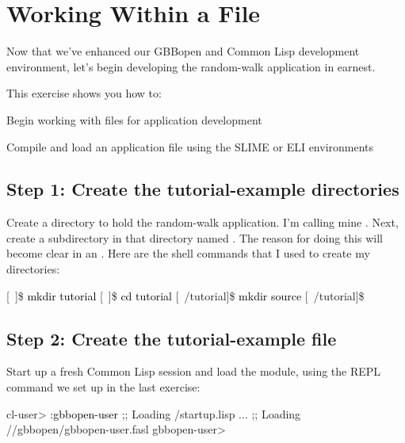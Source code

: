 \documentclass[10pt,twoside,english,pdftex]{article}
\begin{document}

\T\markright{}%
\T\pagestyle{plain}
\T\cleardoublepage
\W{}
\T\pagestyle{fancy}
\T\thispagestyle{fancybottom}
\T\renewcommand{\headrulewidth}{0pt}
\section{Working Within a File}
\label{sec:file}%

Now that we've enhanced our GBBopen and Common Lisp development environment,
let's begin developing the random-walk application in earnest.

\fndocrule

This exercise shows you how to:
\begin{tightitemize}
\item Begin working with files for application development
\item Compile and load an application file using the SLIME or ELI
  environments
\end{tightitemize}

\fndocrule

\subsection*{Step 1: Create the tutorial-example directories}

Create a directory to hold the random-walk application.  I'm calling mine
.  Next, create a subdirectory in that directory named
.  The reason for doing this will become clear in an
. Here are the shell commands
that I used to create my directories:
%
\W\supp
\begin{example}
\textcolor{darkergray}{%
  [~]\$ \textcolor{black}{mkdir tutorial}
  [~]\$ \textcolor{black}{cd tutorial}
  [~/tutorial]\$ \textcolor{black}{mkdir source}
  [~/tutorial]\$}
\end{example}

\subsection*{Step 2: Create the tutorial-example file}

Start up a fresh Common Lisp session and load the 
module, using the REPL command we set up in the last exercise:
%
\W\supp
\begin{smallexample}
\textcolor{darkergray}{%
  cl-user> \textcolor{black}{:gbbopen-user}
  ;; Loading /startup.lisp
     ...
  ;; Loading //gbbopen/gbbopen-user.fasl
  gbbopen-user>}
\end{smallexample}
\end{document}
